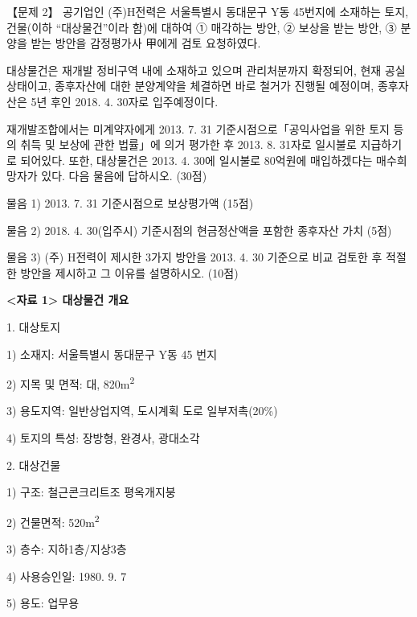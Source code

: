 \begin{longquestion}{【문제 2】}
공기업인 (주)H전력은 서울특별시 동대문구 Y동 45번지에 소재하는 토지, 건물(이하 “대상물건”이라 함)에 대하여 ① 매각하는 방안, ② 보상을 받는 방안, ③ 분양을 받는 방안을 감정평가사 甲에게 검토 요청하였다. \par
대상물건은 재개발 정비구역 내에 소재하고 있으며 관리처분까지 확정되어, 현재 공실상태이고, 종후자산에 대한 분양계약을 체결하면 바로 철거가 진행될 예정이며, 종후자산은 5년 후인 2018. 4. 30자로 입주예정이다. \par
재개발조합에서는 미계약자에게 2013. 7. 31 기준시점으로「공익사업을 위한 토지 등의 취득 및 보상에 관한 법률」에 의거 평가한 후 2013. 8. 31자로 일시불로 지급하기로 되어있다. 또한, 대상물건은 2013. 4. 30에 일시불로 80억원에 매입하겠다는 매수희망자가 있다. 다음 물음에 답하시오. (30점) \par
\medskip\noindent 물음 1) 2013. 7. 31 기준시점으로 보상평가액 (15점) \par
\medskip\noindent 물음 2) 2018. 4. 30(입주시) 기준시점의 현금정산액을 포함한 종후자산 가치 (5점) \par
\medskip\noindent 물음 3) (주) H전력이 제시한 3가지 방안을 2013. 4. 30 기준으로 비교 검토한 후 적절한 방안을 제시하고 그 이유를 설명하시오. (10점) \par
\textbf{<자료 1> 대상물건 개요} \par
1. 대상토지 \par
1) 소재지: 서울특별시 동대문구 Y동 45 번지 \par
2) 지목 및 면적: 대, 820m\textsuperscript{2} \par
3) 용도지역: 일반상업지역, 도시계획 도로 일부저촉(20\%) \par
4) 토지의 특성: 장방형, 완경사, 광대소각 \par
2. 대상건물 \par
1) 구조: 철근콘크리트조 평옥개지붕 \par
2) 건물면적: 520m\textsuperscript{2} \par
3) 층수: 지하1층/지상3층 \par
4) 사용승인일: 1980. 9. 7 \par
5) 용도: 업무용 \par

\end{longquestion}
